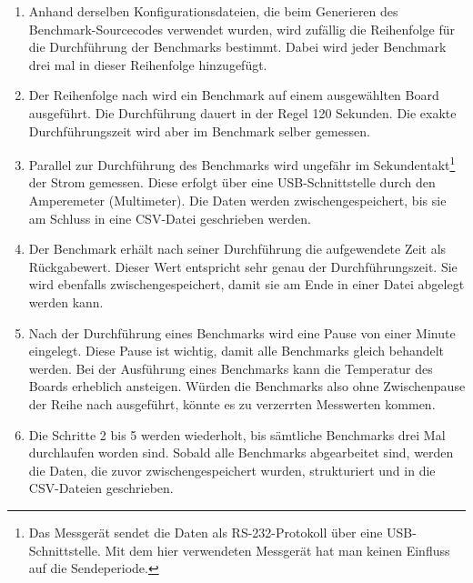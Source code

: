 \begin{enumerate}
\item Anhand derselben Konfigurationsdateien, die beim Generieren des Benchmark-Sourcecodes verwendet wurden, wird zufällig die Reihenfolge für die Durchführung der Benchmarks bestimmt. Dabei wird jeder Benchmark drei mal in dieser Reihenfolge hinzugefügt.
\item Der Reihenfolge nach wird ein Benchmark auf einem ausgewählten Board ausgeführt. Die Durchführung dauert in der Regel 120 Sekunden. Die exakte Durchführungszeit wird aber im Benchmark selber gemessen.
\item Parallel zur Durchführung des Benchmarks wird ungefähr im Sekundentakt\footnote{Das Messgerät sendet die Daten als RS-232-Protokoll über eine USB-Schnittstelle. Mit dem hier verwendeten Messgerät hat man keinen Einfluss auf die Sendeperiode.} der Strom gemessen. Diese erfolgt über eine USB-Schnittstelle durch den Amperemeter (Multimeter). Die Daten werden zwischengespeichert, bis sie am Schluss in eine CSV-Datei geschrieben werden.
\item Der Benchmark erhält nach seiner Durchführung die aufgewendete Zeit als Rückgabewert. Dieser Wert entspricht sehr genau der Durchführungszeit. Sie wird ebenfalls zwischengespeichert, damit sie am Ende in einer Datei abgelegt werden kann.
\item Nach der Durchführung eines Benchmarks wird eine Pause von einer Minute eingelegt. Diese Pause ist wichtig, damit alle Benchmarks gleich behandelt werden. Bei der Ausführung eines Benchmarks kann die Temperatur des Boards erheblich ansteigen. Würden die Benchmarks also ohne Zwischenpause der Reihe nach ausgeführt, könnte es zu verzerrten Messwerten kommen.
\item Die Schritte 2 bis 5 werden wiederholt, bis sämtliche Benchmarks drei Mal durchlaufen worden sind. Sobald alle Benchmarks abgearbeitet sind, werden die Daten, die zuvor zwischengespeichert wurden, strukturiert und in die CSV-Dateien geschrieben.
\end{enumerate}